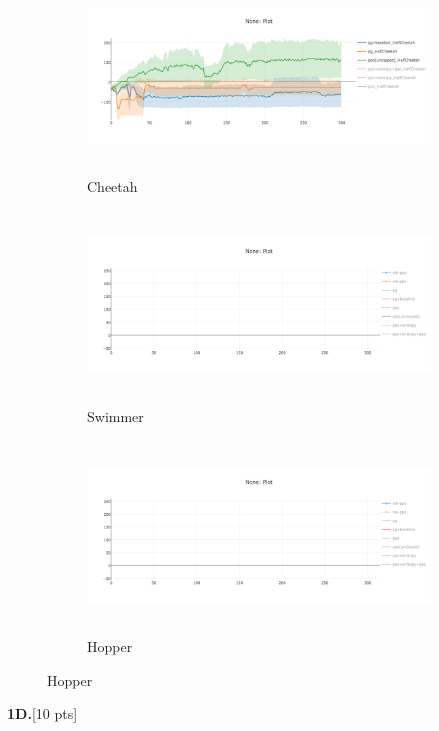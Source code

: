 \documentclass[10pt]{article}
\begin{document}
\begin{figure}[ht!]
    \centering
    \begin{subfigure}[h]{0.6\linewidth}
        \centering
        \includegraphics[height=2in]{figures/clipper.png}
        \caption{Cheetah}
    \end{subfigure}
    \vskip 0.3in
    \begin{subfigure}[h]{0.6\textwidth}
        \centering
        \includegraphics[height=2in]{figures/newplot.png}
        \caption{Swimmer}
    \end{subfigure}
    \vskip 0.3in
    \begin{subfigure}[h]{0.6\textwidth}
        \centering
        \includegraphics[height=2in]{figures/newplot.png}
        \caption{Hopper}
    \end{subfigure}
\end{figure}
\clearpage
\textbf{1D.}[10 pts]
\end{document}
